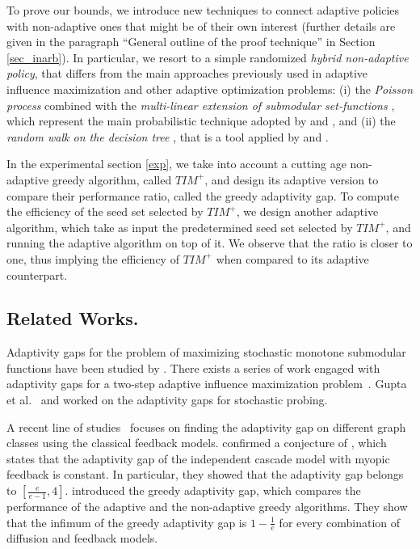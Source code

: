 To prove our bounds, we introduce new techniques to connect adaptive policies with non-adaptive ones that might be of their own interest (further details are given in the paragraph ``General outline of the proof technique'' in Section \ref{sec_inarb}). In particular, we resort to a simple randomized {\em hybrid non-adaptive policy}, that differs from the main approaches previously used in adaptive influence maximization and other adaptive optimization problems:  (i) the {\em Poisson process} \cite{norris} combined with the {\em multi-linear extension of submodular set-functions} \cite{Calinescu11}, which represent the main probabilistic technique adopted by \citet{Asadpour16} and \citet{Chen2019}, and (ii) the {\em random walk on the decision tree} \cite{AdamczykGM15,sahil}, that is a tool applied by \citet{Gupta2017,Bradac19} and \citet{Peng2019}.

In the experimental section \ref{exp}, we take into account a cutting age non-adaptive greedy algorithm, called $TIM^+$, and design its adaptive version to compare their performance ratio, called the greedy adaptivity gap. To compute the efficiency of the seed set selected by $TIM^+$, we design another adaptive algorithm, which take as input the predetermined seed set selected by $TIM^+$, and running the adaptive algorithm on top of it. We observe that the ratio is closer to one, thus implying the efficiency of $TIM^+$ when compared to its adaptive counterpart.  

\subsection*{Related Works.}
Adaptivity gaps for the problem of maximizing stochastic monotone submodular functions have been studied by \citet{Asadpour16}. There exists a series of work engaged with adaptivity gaps for a two-step adaptive influence maximization problem~\cite{Badanidiyuru2016,Rubinstein2015, Seeman2013, Singer2016}. Gupta et al.~\cite{sahil, Gupta2017} and \citet{Bradac19} worked on the adaptivity gaps for stochastic probing. 

A recent line of studies~\cite{Chen2019, Chen2019a, Peng2019} focuses on finding the adaptivity gap on different graph classes using the classical feedback models. \citet{Peng2019} confirmed a conjecture of \citet{Golovin2011a}, which states that the adaptivity gap of the independent cascade model with myopic feedback is constant. In particular, they showed that the adaptivity gap belongs to $[\frac{e}{e-1}, 4]$. \citet{Chen2019a} introduced the greedy adaptivity gap, which compares the performance of the adaptive and the non-adaptive greedy algorithms. They show that the infimum of the greedy adaptivity gap is $1-\frac{1}{e}$ for every combination of diffusion and feedback models.

